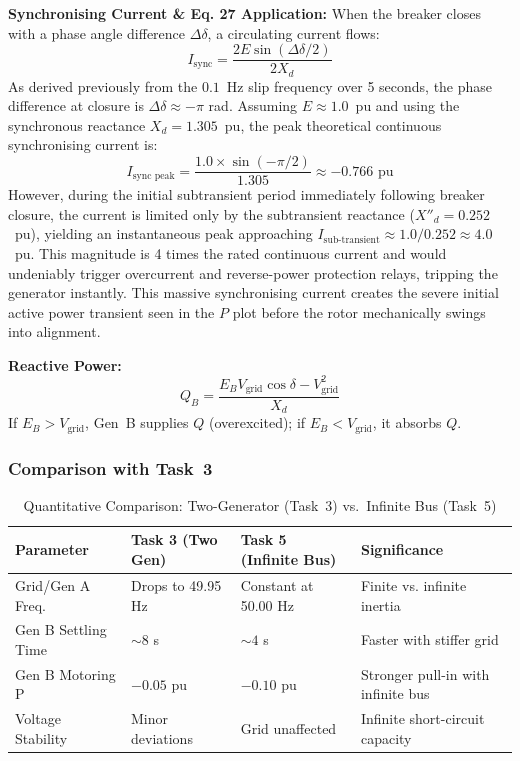 \documentclass[12pt, a4paper]{article}
\begin{document}
\textbf{Synchronising Current \& Eq. 27 Application:}
When the breaker closes with a phase angle difference $\Delta\delta$, a circulating current flows:
\begin{equation}
    I_{\text{sync}} = \frac{2E\sin(\Delta\delta/2)}{2X_d}
    \label{eq:sync_current}
\end{equation}
As derived previously from the $0.1$~Hz slip frequency over 5 seconds, the phase difference at closure is $\Delta\delta \approx -\pi$ rad. Assuming $E \approx 1.0$~pu and using the synchronous reactance $X_d = 1.305$~pu, the peak theoretical continuous synchronising current is:
\begin{equation}
    I_{\text{sync peak}} = \frac{1.0 \times \sin(-\pi/2)}{1.305} \approx -0.766\text{ pu}
\end{equation}
However, during the initial subtransient period immediately following breaker closure, the current is limited only by the subtransient reactance ($X''_d = 0.252$~pu), yielding an instantaneous peak approaching $I_{\text{sub-transient}} \approx 1.0 / 0.252 \approx 4.0$~pu. This magnitude is 4 times the rated continuous current and would undeniably trigger overcurrent and reverse-power protection relays, tripping the generator instantly. This massive synchronising current creates the severe initial active power transient seen in the $P$ plot before the rotor mechanically swings into alignment.

\textbf{Reactive Power:}
\begin{equation}
    Q_B = \frac{E_B V_{\text{grid}} \cos\delta - V_{\text{grid}}^2}{X_d}
    \label{eq:reactive_grid}
\end{equation}
If $E_B > V_{\text{grid}}$, Gen~B supplies $Q$ (overexcited); if $E_B < V_{\text{grid}}$, it absorbs $Q$.

\subsubsection{Comparison with Task~3}

\begin{table}[H]
    \centering
    \caption{Quantitative Comparison: Two-Generator (Task~3) vs.\ Infinite Bus (Task~5)}
    \begin{tabular}{lllp{4cm}}
        \toprule
        \textbf{Parameter} & \textbf{Task 3 (Two Gen)} & \textbf{Task 5 (Infinite Bus)} & \textbf{Significance} \\
        \midrule
        Grid/Gen A Freq. & Drops to 49.95 Hz & Constant at 50.00 Hz & Finite vs. infinite inertia \\
        Gen B Settling Time & $\sim 8$ s & $\sim 4$ s & Faster with stiffer grid \\
        Gen B Motoring P & $-0.05$ pu & $-0.10$ pu & Stronger pull-in with infinite bus \\
        Voltage Stability & Minor deviations & Grid unaffected & Infinite short-circuit capacity \\
        \bottomrule
    \end{tabular}
    \label{tab:task35_comparison}
\end{table}
\end{document}
